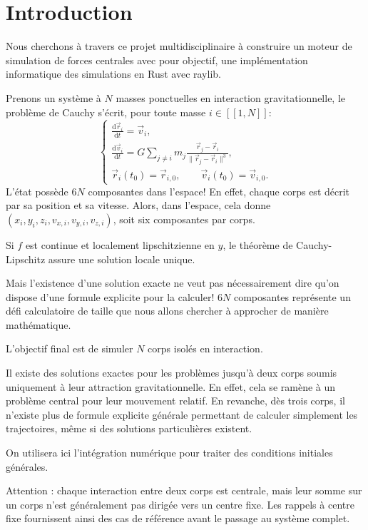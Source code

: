 \part{Introduction}
Nous cherchons à travers ce projet multidisciplinaire à construire un moteur de simulation de forces centrales avec pour objectif, une implémentation informatique des simulations en Rust avec raylib. 

\bigbreak

Prenons un système à $N$ masses ponctuelles en interaction gravitationnelle, le problème de Cauchy s'écrit, pour toute masse $i\in[\![1,N]\!]$:
\begin{equation}
 \begin{cases}
 \displaystyle\frac{\mathrm d\vec r_i}{\mathrm dt}=\vec v_i,\\[4pt]
 \displaystyle\frac{\mathrm d\vec v_i}{\mathrm dt}
 =G\sum_{j\ne i}m_j\frac{\vec r_j-\vec r_i}{\|\vec r_j-\vec r_i\|^3},\\[4pt]
 \vec r_i(t_0)=\vec r_{i,0},\qquad \vec v_i(t_0)=\vec v_{i,0}.
 \end{cases}
\end{equation}
L'état possède $6N$ composantes dans l'espace!
En effet, chaque corps est décrit par sa position et sa vitesse. Alors, dans l'espace, cela donne $(x_i,y_i,z_i,v_{x,i},v_{y,i},v_{z,i})$, soit six composantes par corps.

Si $f$ est continue et localement lipschitzienne en $y$, le théorème de Cauchy-Lipschitz assure une solution locale unique.

Mais l'existence d'une solution exacte ne veut pas nécessairement dire qu'on dispose d'une formule explicite pour la calculer! $6N$ composantes représente un défi calculatoire de taille que nous allons chercher à approcher de manière mathématique.

\bigskip

L'objectif final est de simuler $N$ corps isolés en interaction. 

Il existe des solutions exactes pour les problèmes jusqu'à deux corps soumis uniquement à leur attraction gravitationnelle. En effet, cela se ramène à un problème central pour leur mouvement relatif. En revanche, dès trois corps, il n'existe plus de formule explicite générale permettant de calculer simplement les trajectoires, même si des solutions particulières existent. 

On utilisera ici l'intégration numérique pour traiter des conditions initiales générales.

\bigskip

Attention : chaque interaction entre deux corps est centrale, mais leur somme sur un corps n'est généralement pas dirigée vers un centre fixe. Les rappels à centre fixe fournissent ainsi des cas de référence avant le passage au système complet.




